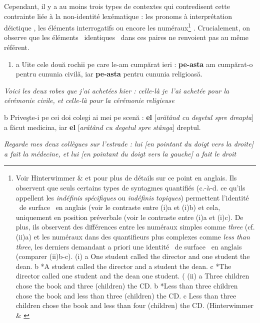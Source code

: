 Cependant, il y a au moins trois types de contextes qui contredisent cette contrainte liée à la non-identité lexématique : les pronoms à interprétation déictique , les éléments interrogatifs  ou encore les numéraux\footnote{Voir Hinterwimmer \& \citet{Repp2008} et \citet{Repp2009} pour plus de détails sur ce point en anglais. Ils observent que seuls certains types de syntagmes quantifiés (c.-à-d. ce qu'ils appellent les \textit{indéfinis} \textit{spécifiques} ou \textit{indéfinis} \textit{topiques}) permettent l'identité {\guillemotleft}~de surface~{\guillemotright} en anglais (voir le contraste entre (i)a et (i)b) et cela, uniquement en position préverbale (voir le contraste entre (i)a et (i)c). De plus, ils observent des différences entre les numéraux simples comme \textit{three} (cf. (ii)a) et les numéraux dans des quantifieurs plus complexes comme \textit{less than three}, les derniers demandant a priori une identité {\guillemotleft}~de surface~{\guillemotright} en anglais (comparer (ii)b-c).
(i)  a  One student called the director and one student the dean.  
  b  *A student called the director and a student the dean.
  c  *The director called one student and the dean one student.          (\citet[9]{Repp2009}
(ii)  a  Three children chose the book and three (children) the CD.  
  b  *Less than three children chose the book and less than three (children) the CD.
  c  Less than three children chose the book and less than four (children) the CD. 
(Hinterwimmer \& \citet[244]{Repp2008}} . Crucialement, on observe que les éléments {\guillemotleft}~identiques~{\guillemotright} dans ces paires ne renvoient pas au même référent.


\begin{enumerate}
\item \label{bkm:Ref299618472}a  Uite cele două rochii pe care le-am cumpărat ieri : \textbf{pe-asta} am cumpărat-o pentru cununia civilă, iar \textbf{pe-asta} pentru cununia religioasă.~ 


\end{enumerate}
{\itshape
Voici les deux robes que j'ai achetées hier : celle-là je~l'ai achetée pour la cérémonie civile, et celle-là pour la cérémonie religieuse } 

  b  Priveşte-i pe cei doi colegi ai mei pe scenă : \textbf{el} [\textit{arătând cu degetul spre dreapta}] a făcut medicina, iar \textbf{el} [\textit{arătând cu degetul spre stânga}] dreptul.

\textit{Regarde mes deux collègues sur l'estrade : lui [en pointant du doigt vers la droite] a fait la médecine, et lui [en pointant du doigt vers la gauche] a fait le droit}  



